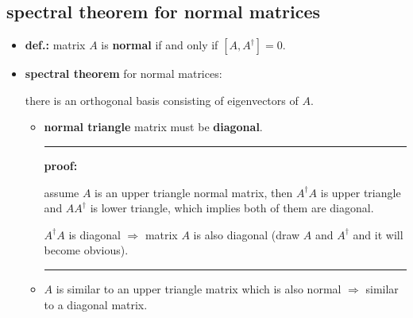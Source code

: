 \subsection{spectral theorem for normal matrices}
\begin{itemize}
	\item \textbf{def.:} matrix $A$ is \textbf{normal} if and only if $[A ,A^\dag] = 0$.
	
	\item \textbf{spectral theorem} for normal matrices:
	
	there is an orthogonal basis consisting of eigenvectors of $A$.
	
	\begin{tcolorbox}[title=proof:]
		\begin{itemize}
			\item \textbf{normal triangle} matrix must be \textbf{diagonal}.
			
			\noindent\rule[0.5ex]{\linewidth}{0.5pt} %
			
			\textbf{proof:}
			
			assume $A$ is an upper triangle normal matrix, then $A^\dag A$ is upper triangle and $A A^\dag$ is lower triangle, which implies both of them are diagonal.
			
			$A^\dag A$ is diagonal $\Longrightarrow$ matrix $A$ is also diagonal (draw $A$ and $A^\dag$ and it will become obvious).
			
			\noindent\rule[0.5ex]{\linewidth}{0.5pt} %
			
			\item $A$ is similar to an upper triangle matrix which is also normal $\Longrightarrow$ similar to a diagonal matrix.
		\end{itemize}
	\end{tcolorbox}
\end{itemize}

